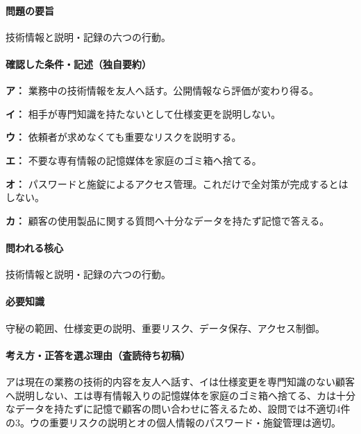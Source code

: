 \paragraph{問題の要旨} 技術情報と説明・記録の六つの行動。

\paragraph{確認した条件・記述（独自要約）}\mbox{}\par

\noindent\textbf{ア：} 業務中の技術情報を友人へ話す。公開情報なら評価が変わり得る。\par

\noindent\textbf{イ：} 相手が専門知識を持たないとして仕様変更を説明しない。\par

\noindent\textbf{ウ：} 依頼者が求めなくても重要なリスクを説明する。\par

\noindent\textbf{エ：} 不要な専有情報の記憶媒体を家庭のゴミ箱へ捨てる。\par

\noindent\textbf{オ：} パスワードと施錠によるアクセス管理。これだけで全対策が完成するとはしない。\par

\noindent\textbf{カ：} 顧客の使用製品に関する質問へ十分なデータを持たず記憶で答える。\par

\paragraph{問われる核心} 技術情報と説明・記録の六つの行動。

\paragraph{必要知識} 守秘の範囲、仕様変更の説明、重要リスク、データ保存、アクセス制御。

\paragraph{考え方・正答を選ぶ理由（査読待ち初稿）} アは現在の業務の技術的内容を友人へ話す、イは仕様変更を専門知識のない顧客へ説明しない、エは専有情報入りの記憶媒体を家庭のゴミ箱へ捨てる、カは十分なデータを持たずに記憶で顧客の問い合わせに答えるため、設問では不適切4件の3。ウの重要リスクの説明とオの個人情報のパスワード・施錠管理は適切。

